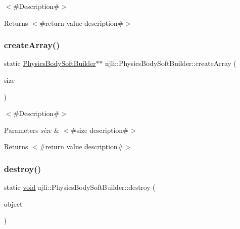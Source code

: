 $<$\#\+Description\#$>$

\begin{DoxyReturn}{Returns}
$<$\#return value description\#$>$ 
\end{DoxyReturn}
\mbox{\label{classnjli_1_1_physics_body_soft_builder_ae084ba415196ba8405e63848904b6684}} 
\subsubsection{\texorpdfstring{create\+Array()}{createArray()}}
{\footnotesize\ttfamily static \mbox{\hyperlink{classnjli_1_1_physics_body_soft_builder}{Physics\+Body\+Soft\+Builder}}$\ast$$\ast$ njli\+::\+Physics\+Body\+Soft\+Builder\+::create\+Array (\begin{DoxyParamCaption}\item[{const \mbox{\hyperlink{_util_8h_a10e94b422ef0c20dcdec20d31a1f5049}{u32}}}]{size }\end{DoxyParamCaption})\hspace{0.3cm}{\ttfamily [static]}}

$<$\#\+Description\#$>$


\begin{DoxyParams}{Parameters}
{\em size} & $<$\#size description\#$>$\\
\hline
\end{DoxyParams}
\begin{DoxyReturn}{Returns}
$<$\#return value description\#$>$ 
\end{DoxyReturn}
\mbox{\label{classnjli_1_1_physics_body_soft_builder_aeeef04cdc3809b35bea315517715a01e}} 
\subsubsection{\texorpdfstring{destroy()}{destroy()}}
{\footnotesize\ttfamily static \mbox{\hyperlink{_thread_8h_af1e856da2e658414cb2456cb6f7ebc66}{void}} njli\+::\+Physics\+Body\+Soft\+Builder\+::destroy (\begin{DoxyParamCaption}\item[{\mbox{\hyperlink{classnjli_1_1_physics_body_soft_builder}{Physics\+Body\+Soft\+Builder}} $\ast$}]{object }\end{DoxyParamCaption})\hspace{0.3cm}{\ttfamily [static]}}

